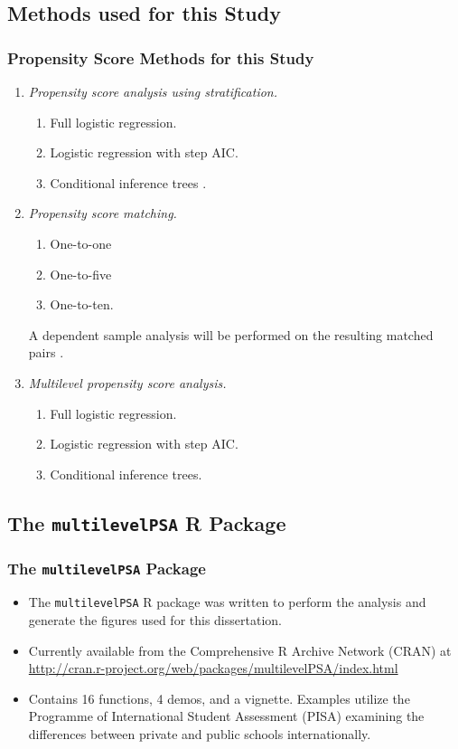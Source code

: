 \documentclass[10pt,handout,mathserif]{beamer}
\begin{document}
\subsection{Methods used for this Study}

\begin{frame}
	\frametitle{Propensity Score Methods for this Study}
	\begin{enumerate}
	    \setlength{\itemsep}{15pt}

		\item \textit{Propensity score analysis using stratification.}
		\begin{enumerate}
			\item Full logistic regression. 
			\item Logistic regression with step AIC.
			\item Conditional inference trees \cite{HorthornHornikZeileis2006}.
		\end{enumerate}
	\pause
	\item \textit{Propensity score matching.} 
		\begin{enumerate}
			\item One-to-one
			\item One-to-five
			\item One-to-ten.
		\end{enumerate}
		A dependent sample analysis will be performed on the resulting matched pairs \cite{Austin2011}.
	\pause
	\item \textit{Multilevel propensity score analysis.}
		\begin{enumerate}
			\item Full logistic regression.
			\item Logistic regression with step AIC.
			\item Conditional inference trees.
		\end{enumerate}
	\end{enumerate}
\end{frame}

\subsection{The \texttt{multilevelPSA} R Package}

\begin{frame}
    \frametitle{The \texttt{multilevelPSA} Package}
    \begin{itemize}
        \setlength{\itemsep}{15pt}
        \item The \texttt{multilevelPSA} R package was written to perform the analysis and generate the figures used for this dissertation.
        \item Currently available from the Comprehensive R Archive Network (CRAN) at \url{http://cran.r-project.org/web/packages/multilevelPSA/index.html}
        \item Contains 16 functions, 4 demos, and a vignette. Examples utilize the Programme of International Student Assessment (PISA) examining the differences between private and public schools internationally.
    \end{itemize}
\end{frame}
\end{document}
